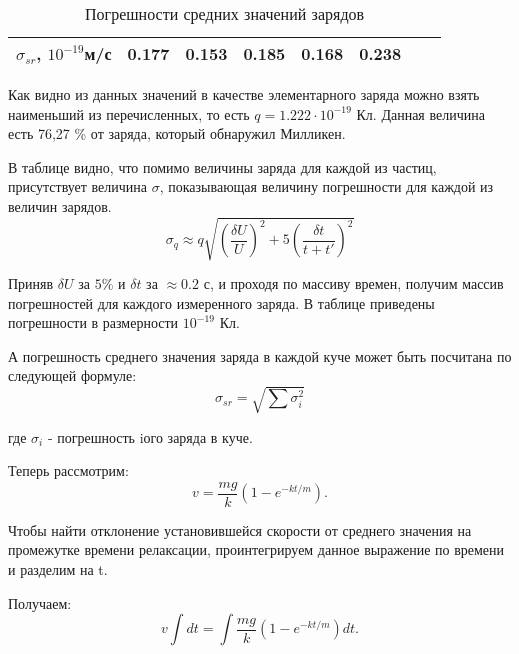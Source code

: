 \documentclass[a4paper,12pt]{article}
\begin{document}
\begin{table}[h]
    \centering
    \begin{center}
    \caption{Погрешности средних значений зарядов}
    \end{center}
    \vspace{0.1cm}
    \label{tab:my_label}
    \begin{tabular}{ |p{2.7cm}||p{2.7cm}|p{2.7cm}|p{2.7cm}|p{2.7cm}|p{2.7cm}|p{2.7cm}|p{2.7cm}| }
 \hline
    $\sigma_{sr}$, $10^{-19}$м/с & 0.177 & 0.153 & 0.185 & 0.168 & 0.238 \\
 \hline
    \end{tabular}
\end{table}
Как видно из данных значений в качестве элементарного заряда можно взять наименьший из перечисленных, то есть $q = 1.222 \cdot 10^{-19}$ Кл. Данная величина есть 76,27 \% от заряда, который обнаружил Милликен.
\par В таблице видно, что помимо величины заряда для каждой из частиц, присутствует величина $\sigma$, показывающая величину погрешности для каждой из величин зарядов.
\begin{equation}
 \sigma_{q} \approx q \sqrt{(\frac{\delta U}{U})^2 + 5(\frac{\delta t}{t + t'})^2}
\end{equation}
\par Приняв $\delta U$ за $5\%$ и $\delta t$ за $\approx 0.2$ с, и проходя по массиву времен, получим массив погрешностей для каждого измеренного заряда. В таблице приведены погрешности в размерности $10^{-19}$ Кл.
\par А погрешность среднего значения заряда в каждой куче может быть посчитана по следующей формуле:
\begin{equation}
 \sigma_{sr} = \sqrt{\sum \sigma_{i}^{2}}
\end{equation}
\par где $\sigma_{i}$ - погрешность iого заряда в куче.
\par Теперь рассмотрим:
\begin{equation}
v = \dfrac{mg}{k}\left(1 - e^{-kt/m}\right).
\end{equation}
\par Чтобы найти отклонение установившейся скорости от среднего значения на промежутке времени релаксации, проинтегрируем данное выражение по времени и разделим на t.
\par Получаем:
\begin{equation}
v \int dt = \int\dfrac{mg}{k}\left(1 - e^{-kt/m}\right)dt.
\end{equation}
\end{document}
